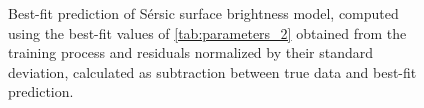 \begin{figure}
  \begin{minipage}{0.49\linewidth}
    \centering
  \end{minipage}
  \begin{minipage}{0.49\linewidth}
    \centering
  \end{minipage}
  \caption[Best-fit prediction Sérsic profile + residuals]{\protect{} Best-fit prediction of Sérsic surface brightness model, computed using the best-fit values of \cref{tab:parameters_2} obtained from the training process and \protect{} residuals normalized by their standard deviation, calculated as subtraction between true data and best-fit prediction.}
  \label{fig:sersic_best}
\end{figure}

